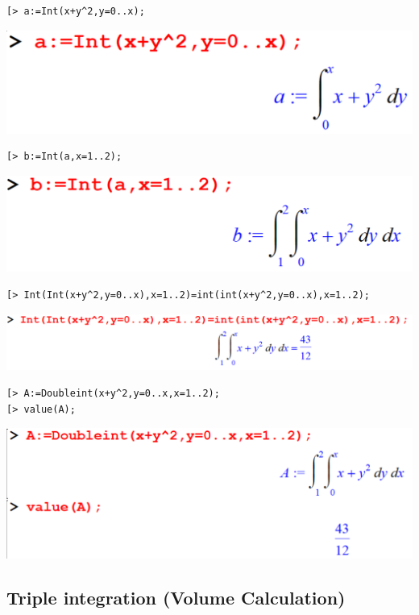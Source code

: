 \documentclass[
]{book}
\theoremstyle{definition}
\theoremstyle{definition}
\theoremstyle{definition}
\theoremstyle{definition}
\theoremstyle{remark}
\begin{document}
\begin{verbatim}
[> a:=Int(x+y^2,y=0..x);
\end{verbatim}

\includegraphics{figures/Lesson 6/fig22.png}

\begin{verbatim}
[> b:=Int(a,x=1..2);
\end{verbatim}

\includegraphics{figures/Lesson 6/fig23.png}

\begin{verbatim}
[> Int(Int(x+y^2,y=0..x),x=1..2)=int(int(x+y^2,y=0..x),x=1..2);
\end{verbatim}

\includegraphics{figures/Lesson 6/fig24.png}

\begin{verbatim}
[> A:=Doubleint(x+y^2,y=0..x,x=1..2);
[> value(A);
\end{verbatim}

\includegraphics{figures/Lesson 6/fig25.png}

\subsection{Triple integration (Volume Calculation)}\label{triple-integration-volume-calculation}
\end{document}
